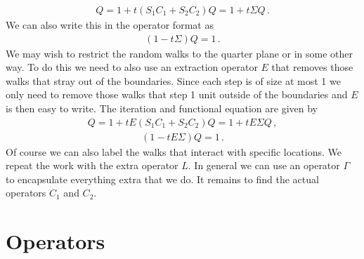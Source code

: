 \begin{align}
	Q = 1 + t(S_1 C_1 + S_2 C_2)Q = 1 + t\Sigma Q\,.
\end{align}
We can also write this in the operator format as
\begin{align}
	(1-t\Sigma) Q = 1\,.
\end{align}
We may wish to restrict the random walks to the quarter plane or in some other way. To do this we need to also use an extraction operator $E$ that removes those walks that stray out of the boundaries. Since each step is of size at most 1 we only need to remove those walks that step 1 unit outside of the boundaries and $E$ is then easy to write. The iteration and functional equation are given by
\begin{align}
	Q = 1 + tE(S_1 C_1 + S_2 C_2)Q = 1 + tE\Sigma Q\,,
\end{align}
\begin{align}
	(1-tE\Sigma)Q = 1\,.
\end{align}
Of course we can also label the walks that interact with specific locations. We repeat the work with the extra operator $L$. In general we can use an operator $\Gamma$ to encapsulate everything extra that we do. It remains to find the actual operators $C_1$ and $C_2$.

\section{Operators}

